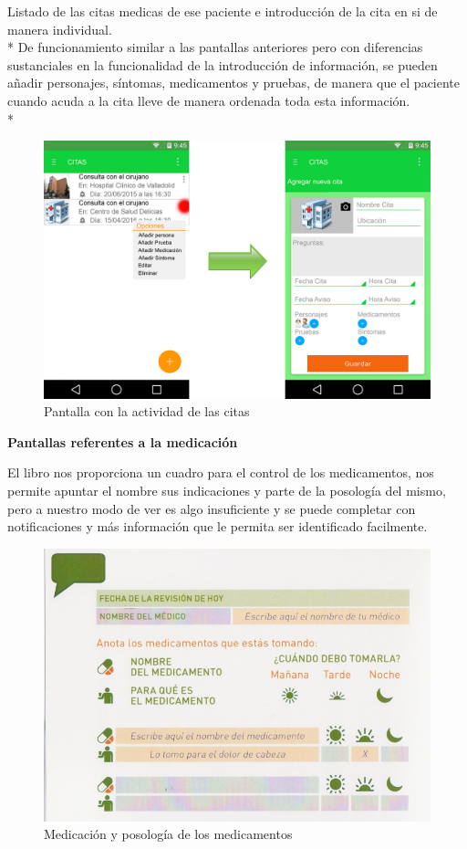 \documentclass[../pfc.tex]{subfiles}
\begin{document}
		
		Listado de las citas medicas de ese paciente e introducción de la cita en si de manera individual.\\*
		De funcionamiento similar a las pantallas anteriores pero con diferencias sustanciales en la funcionalidad de la introducción de información, se pueden añadir personajes, síntomas, medicamentos y pruebas, de manera que el paciente cuando acuda a la cita lleve de manera ordenada toda esta información.\\*
		
		\begin{figure}[H]
			\centering
			\includegraphics[width=0.7\linewidth]{../images/citas}
			\caption{Pantalla con la actividad de las citas}
			\label{fig:citas}
		\end{figure}
		
		
		\textbf{Pantallas referentes a la medicación}
		
		El libro nos proporciona un cuadro para el control de los medicamentos, nos permite apuntar el nombre sus indicaciones y parte de la posología del mismo, pero a nuestro modo de ver es algo insuficiente y se puede completar con notificaciones y más información que le permita ser identificado facilmente.
		
		\begin{figure}[H]
			\centering
			\includegraphics[width=0.7\linewidth]{../folleto/014_corto}
			\caption{Medicación y posología de los medicamentos}
			\label{fig:medicamentacion_libro}
		\end{figure}
				
\end{document}
